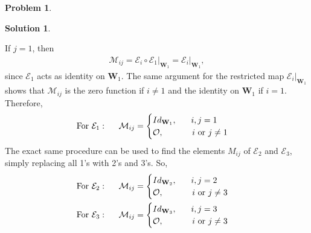 \documentclass{article}
\theoremstyle{definition}
\newtheorem*{prob*}{Problem}
\newtheorem*{sln*}{Solution}
\newcommand{\W}{\mathbf{W}}
\newcommand{\M}{\mathcal{M}}
\newcommand{\E}{\mathcal{E}}
\begin{document}
\begin{prob*}
\begin{sln*}
\begin{enumerate}
			If $j = 1$, then 
			\begin{align*}
			\M_{ij} = \E_i \circ \E_1 \bigg\vert_{\W_1} = \E_i \bigg\vert_{\W_1},
			\end{align*} 
			since $\E_1$ acts as identity on $\W_1$. The same argument for the restricted map $\E_i\bigg\vert_{\W_1}$ shows that $\M_{ij}$ is the zero function if $i\neq 1$ and the identity on $\W_1$ if $i=1$. Therefore,
			\begin{align*}
			\text{For }\E_1:\hspace{0.5cm}
			\M_{ij} = \begin{cases}
			Id_{\W_1},\hspace{0.6cm}   i,j=1\\
			\mathcal{O},\hspace{1.2cm}    i\text{ or }j\neq 1
			\end{cases}
			\end{align*}
			The exact same procedure can be used to find the elements $M_{ij}$ of $\E_2$ and $\E_3$, simply replacing all 1's with 2's and 3's. So,
			\begin{align*}
			&\text{For }\E_2:\hspace{0.5cm}\M_{ij} = 
			\begin{cases}
			Id_{\W_2},\hspace{0.6cm}   i,j=2\\
			\mathcal{O},\hspace{1.2cm}    i\text{ or }j\neq 3
			\end{cases}\\
			&\text{For }\E_3:\hspace{0.5cm}\M_{ij} = 
			\begin{cases}
			Id_{\W_3},\hspace{0.6cm}   i,j=3\\
			\mathcal{O},\hspace{1.2cm}    i\text{ or }j\neq 3
			\end{cases}
			\end{align*}
			
			
			
			
			
			
			
			
			
			
		
			
		\end{enumerate} 
		
	\end{sln*}
	
\end{prob*}
\end{document}
